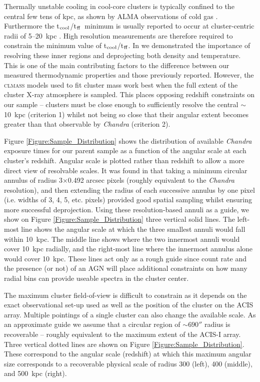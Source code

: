 \documentclass[twocolumn]{aastex6}
\newcommand{\tctff}{{t$_{\rm cool}$/t$_{\rm ff}$}}
\begin{document}
Thermally unstable cooling in cool-core clusters is typically confined to the central few tens of kpc, as shown by ALMA observations of cold gas \cite[e.g.][]{Russell14,McNamara14,Russell16,Tremblay16,Vantyghem16}.  Furthermore the \tctff\ minimum is usually reported to occur at cluster-centric radii of 5--20~kpc \cite[e.g.][]{Gaspari12,Voit15b,Hogan17}.  High resolution measurements are therefore required to constrain the minimum value of \tctff.  In \citet[][]{Hogan17} we demonstrated the importance of resolving these inner regions and deprojecting both density and temperature.  This is one of the main contributing factors to the difference between our measured thermodynamic properties and those previously reported.  However, the \textsc{clmass} models used to fit cluster mass \cite[][see Section \ref{Section:Mass_Fitting}]{Nulsen10} work best when the full extent of the cluster X-ray atmosphere is sampled.  This places opposing redshift constraints on our sample -- clusters must be close enough to sufficiently resolve the central $\sim$10~kpc (criterion 1) whilst not being so close that their angular extent becomes greater than that observable by {\it Chandra} (criterion 2).

Figure \ref{Figure:Sample_Distribution} shows the distribution of available {\it Chandra} exposure times for our parent sample as a function of the angular scale at each cluster's redshift.  Angular scale is plotted rather than redshift to allow a more direct view of resolvable scales.  It was found in \citet[][]{Hogan17} that taking a minimum circular annulus of radius 3$\times$0.492 arcsec pixels (roughly equivalent to the {\it Chandra} resolution), and then extending the radius of each successive annulus by one pixel (i.e. widths of 3, 4, 5, etc. pixels) provided good spatial sampling whilst ensuring more successful deprojection.  Using these resolution-based annuli as a guide,  we show on Figure \ref{Figure:Sample_Distribution} three vertical solid lines.  The left-most line shows the angular scale at which the three smallest annuli would fall within 10~kpc.  The middle line shows where the two innermost annuli would cover 10~kpc radially, and the right-most line where the innermost annulus alone would cover 10~kpc.  These lines act only as a rough guide since count rate and the presence (or not) of an AGN will place additional constraints on how many radial bins can provide useable spectra in the cluster center.

The maximum cluster field-of-view is difficult to constrain as it depends on the exact observational set-up used as well as the position of the cluster on the ACIS array.  Multiple pointings of a single cluster can also change the available scale.  As an approximate guide we assume that a circular region of $\sim690''$ radius is recoverable -- roughly equivalent to the maximum extent of the ACIS-I array.  Three vertical dotted lines are shown on Figure \ref{Figure:Sample_Distribution}.  These correspond to the angular scale (redshift) at which this maximum angular size corresponds to a recoverable physical scale of radius 300 (left), 400 (middle), and 500~kpc (right).  
\end{document}
